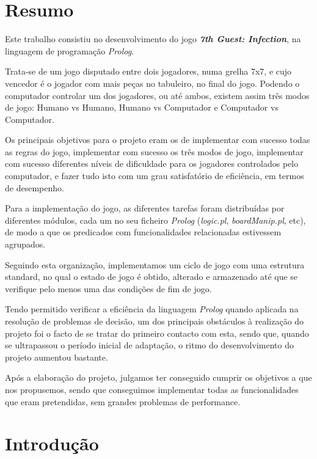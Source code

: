 \documentclass[a4paper]{article}
\begin{document}
\newpage

\section*{Resumo}

\bigskip
Este trabalho consistiu no desenvolvimento do jogo \textbf{\textit{7th Guest: Infection}}, na linguagem de programação \textit{Prolog}.

\bigskip
Trata-se de um jogo disputado entre dois jogadores, numa grelha 7x7, e cujo vencedor é o jogador com mais peças no tabuleiro, no final do jogo. Podendo o computador controlar um dos jogadores, ou até ambos, existem assim três modos de jogo: Humano vs Humano, Humano vs Computador e Computador vs Computador.

\bigskip
Os principais objetivos para o projeto eram os de implementar com sucesso todas as regras do jogo, implementar com sucesso os três modos de jogo, implementar com sucesso diferentes níveis de dificuldade para os jogadores controlados pelo computador, e fazer tudo isto com um grau satisfatório de eficiência, em termos de desempenho.

\bigskip
Para a implementação do jogo, as diferentes tarefas foram distribuídas por diferentes módulos, cada um no seu ficheiro \textit{Prolog} (\textit{logic.pl}, \textit{boardManip.pl}, etc), de modo a que os predicados com funcionalidades relacionadas estivessem agrupados.

Seguindo esta organização, implementamos um ciclo de jogo com uma estrutura standard, no qual o estado de jogo é obtido, alterado e armazenado até que se verifique pelo menos uma das condições de fim de jogo.

\bigskip
Tendo permitido verificar a eficiência da linguagem \textit{Prolog} quando aplicada na resolução de problemas de decisão, um dos principais obstáculos à realização do projeto foi o facto de se tratar do primeiro contacto com esta, sendo que, quando se ultrapassou o período inicial de adaptação, o ritmo do desenvolvimento do projeto aumentou bastante.

\bigskip
Após a elaboração do projeto, julgamos ter conseguido cumprir os objetivos a que nos propusemos, sendo que conseguimos implementar todas as funcionalidades que eram pretendidas, sem grandes problemas de performance.
    
\newpage
\tableofcontents

\newpage

\section{Introdução}
\end{document}
